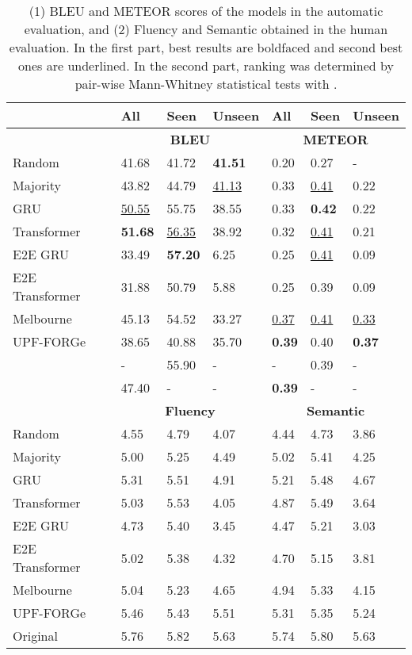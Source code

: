 \documentclass[11pt,a4paper]{article}
\begin{document}
\begin{table*}
\centering
\footnotesize{
\begin{tabular}{l l l l l l l}
\toprule
                         & \textbf{All} & \textbf{Seen} & \textbf{Unseen} & \textbf{All} & \textbf{Seen} & \textbf{Unseen} \\
\midrule
  & \multicolumn{3}{c}{\bf BLEU} & \multicolumn{3}{c}{\bf METEOR} \\
\midrule
Random          & 41.68 & 41.72 & \bf{41.51} & 0.20 & 0.27 & - \\
Majority        & 43.82 & 44.79 & \underline{41.13} & 0.33 & \underline{0.41} & 0.22 \\
GRU             & \underline{50.55} & 55.75 & 38.55 & 0.33 & \bf{0.42} & 0.22 \\
Transformer     & \bf{51.68} & \underline{56.35} & 38.92 & 0.32 & \underline{0.41} & 0.21 \\
E2E GRU         & 33.49 & \bf{57.20} &  6.25 & 0.25 & \underline{0.41} & 0.09 \\
E2E Transformer & 31.88 & 50.79 &  5.88 & 0.25 & 0.39 & 0.09 \\
Melbourne       & 45.13 & 54.52 & 33.27 & \underline{0.37} & \underline{0.41} & \underline{0.33} \\
UPF-FORGe       & 38.65 & 40.88 & 35.70 & \bf{0.39} & 0.40 & \bf{0.37} \\
\cite{marcheggiani2018} & - & 55.90 & - & - & 0.39 & - \\
\cite{amit2019} & 47.40 & - & - & \bf{0.39} & - & - \\
\midrule
\midrule
  & \multicolumn{3}{c}{\bf Fluency} & \multicolumn{3}{c}{\bf Semantic} \\
\midrule
Random          & 4.55  & 4.79  & 4.07  & 4.44  & 4.73   & 3.86 \\
Majority        & 5.00 & 5.25 & 4.49 & 5.02 & 5.41  & 4.25 \\
GRU             & 5.31  & 5.51 & 4.91 & 5.21 & 5.48  & 4.67 \\
Transformer     & 5.03 & 5.53 & 4.05  & 4.87  & 5.49  & 3.64 \\
E2E GRU         & 4.73 & 5.40 & 3.45  & 4.47  & 5.21  & 3.03 \\
E2E Transformer & 5.02 & 5.38 & 4.32 & 4.70 & 5.15 & 3.81 \\
Melbourne       & 5.04 & 5.23 & 4.65 & 4.94  & 5.33  & 4.15 \\
UPF-FORGe       & 5.46  & 5.43 & 5.51 & 5.31  & 5.35  & 5.24 \\
\midrule
Original        & 5.76  & 5.82  & 5.63  & 5.74  & 5.80   & 5.63 \\
\bottomrule
\end{tabular}
}
\caption{(1) BLEU and METEOR scores of the models in the automatic evaluation, and (2) Fluency and Semantic obtained in the human evaluation. In the first part, best results are boldfaced and second best ones are underlined. In the second part, ranking was determined by pair-wise Mann-Whitney statistical tests with .}
\label{table:results2}
\end{table*}
\end{document}
